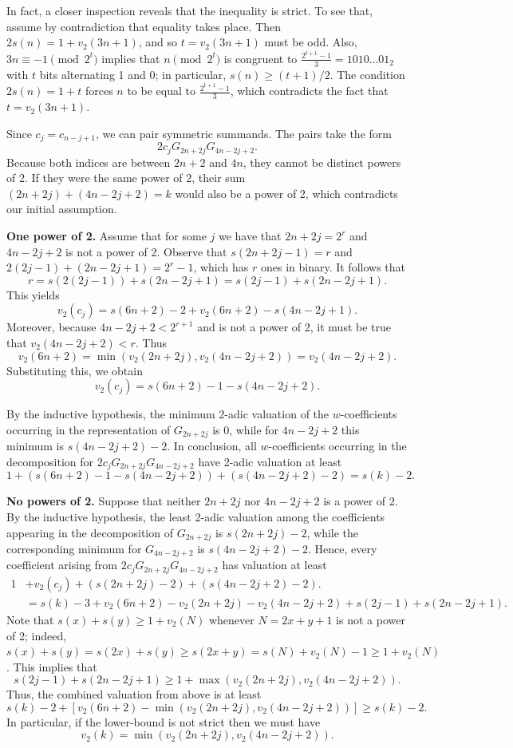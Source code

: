 \documentclass[12pt]{amsart}
\begin{document}
In fact, a closer inspection reveals that the inequality is strict. To see that, assume by contradiction that equality takes place. Then $2s(n)=1+v_2(3n+1)$, and so $t=v_2(3n+1)$ must be odd. Also, $3n\equiv -1\pmod {2^t}$ implies that $n\pmod {2^t}$ is congruent to $\frac{2^{t+1}-1}{3}=1010\ldots 01_2$ with $t$ bits alternating 1 and 0; in particular, $s(n)\ge (t+1)/2$. The condition $2s(n)=1+t$ forces $n$ to be equal to $\frac{2^{t+1}-1}{3}$, which contradicts the fact that $t=v_2(3n+1)$. 


\bigskip

\noindent Since $c_j=c_{n-j+1}$, we can pair symmetric summands. The pairs take the form  \[ 2c_j G_{2n+2j} G_{4n-2j+2}.\] Because both indices are between $2n+2$ and $4n$, they cannot be distinct powers of 2. If they were the same power of 2, their sum $(2n+2j)+(4n-2j+2)=k$ would also be a power of 2, which contradicts our initial assumption. 

\bigskip

\noindent \textbf{One power of 2.} Assume that for some $j$ we have that $2n+2j=2^r$ and $4n-2j+2$ is not a power of 2. Observe that $s(2n+2j-1)=r$ and $2(2j-1)+(2n-2j+1)=2^r-1$, which has $r$ ones in binary. It follows that
\[ r=s(2(2j-1))+s(2n-2j+1)=s(2j-1)+s(2n-2j+1).\] This yields
\[ v_2(c_j) = s(6n+2) -2 +v_2(6n+2) -s(4n-2j+1).\] Moreover, because $4n-2j+2<2^{r+1}$ and is not a power of 2, it must be true that $v_2(4n-2j+2)<r$. Thus \[ v_2(6n+2)=\min \left( v_2(2n+2j),v_2(4n-2j+2) \right)=v_2(4n-2j+2).\] Substituting this, we obtain 
\[ v_2(c_j) = s(6n+2) - 1 - s(4n-2j+2).\]

By the inductive hypothesis, the minimum 2-adic valuation of the $w$-coefficients occurring in the representation of $G_{2n+2j}$ is 0, while for $4n-2j+2$ this minimum is $s(4n-2j+2)-2$. In conclusion, all $w$-coefficients occurring in the decomposition for $2c_j G_{2n+2j} G_{4n-2j+2}$ have 2-adic valuation at least 
\[ 1+\left( s(6n+2) - 1 - s(4n-2j+2) \right)+ \left(s(4n-2j+2)-2\right)=s(k)-2. \]

\noindent \textbf{No powers of 2.} Suppose that neither $2n+2j$ nor $4n-2j+2$ is a power of 2. By the inductive hypothesis, the least 2-adic valuation among the coefficients appearing in the decomposition of $G_{2n+2j}$ is $s(2n+2j)-2$, while the corresponding minimum for $G_{4n-2j+2}$ is $s(4n-2j+2)-2$. Hence, every coefficient arising from $2c_j G_{2n+2j} G_{4n-2j+2}$ has valuation at least 
\begin{align*}
 1 & + v_2(c_j)+(s(2n+2j)-2)+(s(4n-2j+2)-2).\\
 &=s(k)-3+v_2(6n+2)-v_2(2n+2j)-v_2(4n-2j+2)+s(2j-1)+s(2n-2j+1).
\end{align*}
Note that $s(x)+s(y)\ge 1+v_2(N)$ whenever $N=2x+y+1$ is not a power of 2; indeed, $s(x)+s(y)=s(2x)+s(y)\ge s(2x+y)=s(N)+v_2(N)-1\ge 1+v_2(N)$. This implies that 
\[ s(2j-1)+s(2n-2j+1)\ge 1+\max \left( v_2(2n+2j),v_2(4n-2j+2) \right).\] Thus, the combined valuation from above is at least 
\[ s(k)-2+[v_2(6n+2)-\min\left( v_2(2n+2j),v_2(4n-2j+2) \right)]\ge s(k)-2.\] In particular, if the lower-bound is not strict then we must have
\[v_2(k)=\min\left( v_2(2n+2j),v_2(4n-2j+2) \right).\] 
\end{document}
